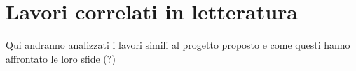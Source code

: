 \chapter{Lavori correlati in letteratura} \label{Letteratura}
Qui andranno analizzati i lavori simili al progetto proposto e come questi hanno affrontato le loro sfide (?)